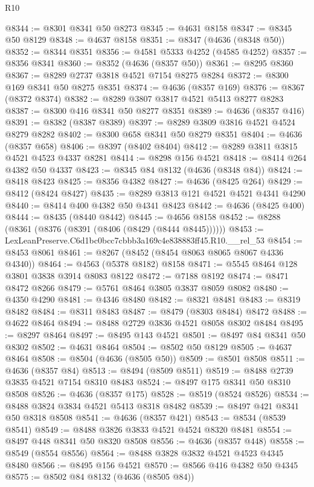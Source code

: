 \begin{lexlean}{R10}
\begin{coremodule}
@8344 := @8301 @8341 @50 @8273
@8345 := @4631 @8158
@8347 := @8345 @50 @8129
@8348 := @4637 @8158
@8351 := @8347 (@4636 (@8348 @50))
@8352 := @8344 @8351
@8356 := @4581 @5333 @4252 (@4585 @4252)
@8357 := @8356 @8341
@8360 := @8352 (@4636 (@8357 @50))
@8361 := @8295 @8360
@8367 := @8289 @2737 @3818 @4521 @7154 @8275 @8284
@8372 := @8300 @169 @8341 @50 @8275 @8351
@8374 := @4636 (@8357 @169)
@8376 := @8367 (@8372 @8374)
@8382 := @8289 @3807 @3817 @4521 @5413 @8277 @8283
@8387 := @8300 @416 @8341 @50 @8277 @8351
@8389 := @4636 (@8357 @416)
@8391 := @8382 (@8387 @8389)
@8397 := @8289 @3809 @3816 @4521 @4524 @8279 @8282
@8402 := @8300 @658 @8341 @50 @8279 @8351
@8404 := @4636 (@8357 @658)
@8406 := @8397 (@8402 @8404)
@8412 := @8289 @3811 @3815 @4521 @4523 @4337 @8281
@8414 := @8298 @156 @4521
@8418 := @8414 @264 @4382 @50 @4337
@8423 := @8345 @84 @8132 (@4636 (@8348 @84))
@8424 := @8418 @8423
@8425 := @8356 @4382
@8427 := @4636 (@8425 @264)
@8429 := @8412 (@8424 @8427)
@8435 := @8289 @3813 @121 @4521 @4521 @4341 @4290
@8440 := @8414 @400 @4382 @50 @4341 @8423
@8442 := @4636 (@8425 @400)
@8444 := @8435 (@8440 @8442)
@8445 := @4656 @8158
@8452 := @8288 (@8361 (@8376 (@8391 (@8406 (@8429 (@8444 @8445))))))
@8453 := LexLeanPreserve.C6d1bc0bcc7cbbb3a169c4e838883ff45.R10.__rel_53
@8454 := @8453 @8061
@8461 := @8267 (@8452 (@8454 @8063 @8065 @8067 @4336 @4340))
@8464 := @4563 (@5378 @8182) @8158
@8471 := @5545 @8464 @128 @3801 @3838 @3914 @8083 @8122
@8472 := @7188 @8192
@8474 := @8471 @8472 @8266
@8479 := @5761 @8464 @3805 @3837 @8059 @8082
@8480 := @4350 @4290
@8481 := @4346 @8480
@8482 := @8321 @8481
@8483 := @8319 @8482
@8484 := @8311 @8483
@8487 := @8479 (@8303 @8484) @8472
@8488 := @4622 @8464
@8494 := @8488 @2729 @3836 @4521 @8058 @8302 @8484
@8495 := @8297 @8464
@8497 := @8495 @143 @4521
@8501 := @8497 @84 @8341 @50 @8302
@8502 := @4631 @8464
@8504 := @8502 @50 @8129
@8505 := @4637 @8464
@8508 := @8504 (@4636 (@8505 @50))
@8509 := @8501 @8508
@8511 := @4636 (@8357 @84)
@8513 := @8494 (@8509 @8511)
@8519 := @8488 @2739 @3835 @4521 @7154 @8310 @8483
@8524 := @8497 @175 @8341 @50 @8310 @8508
@8526 := @4636 (@8357 @175)
@8528 := @8519 (@8524 @8526)
@8534 := @8488 @3824 @3834 @4521 @5413 @8318 @8482
@8539 := @8497 @421 @8341 @50 @8318 @8508
@8541 := @4636 (@8357 @421)
@8543 := @8534 (@8539 @8541)
@8549 := @8488 @3826 @3833 @4521 @4524 @8320 @8481
@8554 := @8497 @448 @8341 @50 @8320 @8508
@8556 := @4636 (@8357 @448)
@8558 := @8549 (@8554 @8556)
@8564 := @8488 @3828 @3832 @4521 @4523 @4345 @8480
@8566 := @8495 @156 @4521
@8570 := @8566 @416 @4382 @50 @4345
@8575 := @8502 @84 @8132 (@4636 (@8505 @84))

\end{coremodule}
\end{lexlean}
